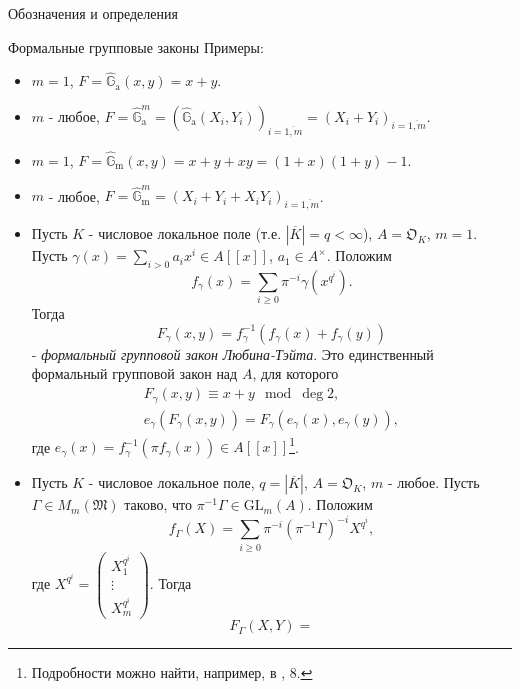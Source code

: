 \documentclass[a4paper,14pt]{extarticle}
\theoremstyle{definition}
\newcommand{\GL}[2]{\mathrm{GL}_{#1}\left(#2\right)}
\newcommand{\bG}{\mathbb{G}}
\newcommand{\fM}{\mathfrak{M}}
\newcommand{\fO}{\mathfrak{O}}
\newcommand{\GGa}{\hat{\bG}_{\mathrm{a}}}
\newcommand{\GGm}{\hat{\bG}_{\mathrm{m}}}
\begin{document}
\begin{section}{Обозначения и определения}
\begin{subsection}{Формальные групповые законы}
Примеры:
\begin{itemize}
    \item ${ m = 1 }$, ${ F = \GGa(x, y) = x + y }$.
    \item $m$ - любое, ${ F = \GGa^m = (\GGa(X_i, Y_i))_{i = \overline{1, m}} = (X_i + Y_i)_{i = \overline{1, m}} }$.
    \item ${ m = 1 }$, ${ F = \GGm(x, y) = x + y + x y = (1 + x)(1 + y) - 1 }$.
    \item $m$ - любое, ${ F = \GGm^m = (X_i + Y_i + X_i Y_i)_{i = \overline{1, m}} }$.
    \item Пусть $K$ - числовое локальное поле (т.е. ${ |\overline{K}| = q < \infty }$), ${ A = \fO_K }$, ${ m = 1 }$. Пусть ${ \gamma(x) = \sum\limits_{i > 0} a_i x^i \in A[[x]] }$, ${ a_1 \in A^\times }$. Положим
    \begin{equation*}
        f_\gamma(x) =
        \sum_{i \geq 0}
        \pi^{-i} \gamma(x^{q^i}).
    \end{equation*}
    Тогда
    \begin{equation*}
        F_\gamma(x, y) =
        f_\gamma^{-1}(f_\gamma(x) + f_\gamma(y))
    \end{equation*}
    - \textit{формальный групповой закон Любина-Тэйта}. Это единственный формальный групповой закон над $A$, для которого
    \begin{gather*}
        F_\gamma(x, y) \equiv
        x + y \mod \deg 2, \\
        e_\gamma(F_\gamma(x, y)) =
        F_\gamma(e_\gamma(x), e_\gamma(y)),
    \end{gather*}
    где ${ e_\gamma(x) = f_\gamma^{-1}(\pi f_\gamma(x)) \in A[[x]] }$\footnote{
        Подробности можно найти, например, в \cite{Hazewinkel}, 8.
    }.
    \item Пусть $K$ - числовое локальное поле, ${ q = |\overline{K}| }$, ${ A = \fO_K }$, $m$ - любое. Пусть ${ \Gamma \in M_m(\fM) }$ таково, что ${ \pi^{-1} \Gamma \in \GL{m}{A} }$. Положим
    \begin{equation*}
        f_\Gamma(X) =
        \sum\limits_{i \geq 0}
        \pi^{-i} (\pi^{-1} \Gamma)^{-i} X^{q^i},
    \end{equation*}
    где ${ X^{q^i} = \left( \begin{matrix} X_1^{q^i} \\ \vdots \\ X_m^{q^i} \end{matrix} \right) }$. Тогда
    \begin{equation*}
        F_\Gamma(X, Y) =

\end{equation*}
\end{itemize}
\end{subsection}
\end{section}
\end{document}
